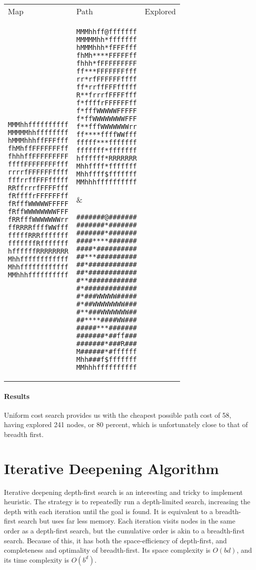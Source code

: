 \documentclass[12pt, article]{scrartcl}
\begin{document}
\begin{tabular}{p{2in} p{2in} p{2in}}
Map & Path & Explored \\

\begin{verbatim}
MMMhhffffffffff
MMMMMhhffffffff
hMMMhhhffFFFfff
fhMhffFFFFFFFff
fhhhffFFFFFFFFF
ffffFFFFFFFFfff
rrrrfFFFFFFffff
fffrrffFFFfffff
RRffrrrfFFFFfff
fRffffrFFFFFFff
fRfffWWWWWFFFFF
fRffWWWWWWWWFFF
fRRfffWWWWWWWrr
ffRRRRffffWWfff
fffffRRRfffffff
fffffffRfffffff
hffffffRRRRRRRR
Mhhffffffffffff
Mhhffffffffffff
MMhhhffffffffff
\end{verbatim}
&
\begin{verbatim}
MMMhhff@fffffff
MMMMMhh*fffffff
hMMMhhh*fFFFfff
fhMh****FFFFFff
fhhh*fFFFFFFFFF
ff***FFFFFFFfff
rr*rfFFFFFFffff
ff*rrffFFFfffff
R**frrrfFFFFfff
f*ffffrFFFFFFff
f*fffWWWWWFFFFF
f*ffWWWWWWWWFFF
f**fffWWWWWWWrr
ff****ffffWWfff
fffff***fffffff
fffffff*fffffff
hffffff*RRRRRRR
Mhhffff*fffffff
Mhhffff$fffffff
MMhhhffffffffff
\end{verbatim}
&
\begin{verbatim}
#######@#######
#######*#######
#######*#######
####****#######
####*##########
##***##########
##*############
##*############
#**############
#*#############
#*###WWWWW#####
#*##WWWWWWWW###
#**###WWWWWWW##
##****####WW###
#####***#######
#######*##ff###
#######*###R###
M######*#ffffff
Mhh###f$fffffff
MMhhhffffffffff
\end{verbatim}
\end{tabular}
\paragraph{Results}
Uniform cost search provides us with the cheapest possible path cost of 58, having explored 241 nodes, or 80 percent, which is unfortunately close to that of breadth first. \\

\section{Iterative Deepening Algorithm}
Iterative deepening depth-first search is an interesting and tricky to implement heuristic. The strategy is to repeatedly run a depth-limited search, increasing the depth with each iteration until the goal is found. It is equivalent to a breadth-first search but uses far less memory. Each iteration visits nodes in the same order as a depth-first search, but the cumulative order is akin to a breadth-first search. Because of this, it has both the space-efficiency of depth-first, and completeness and optimality of breadth-first. Its space complexity is $O(bd)$, and its time complexity is $O(b^d)$. \\
\end{document}
